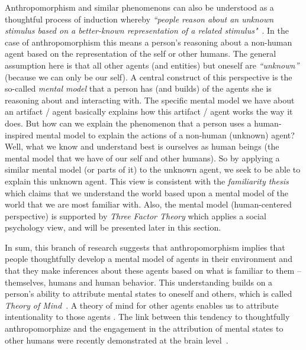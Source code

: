 \documentclass{frontiersSCNS} %
\begin{document}
Anthropomorphism and similar phenomenons can also be understood as a thoughtful process of induction whereby \textit{``people reason about an unknown stimulus based on a better-known representation of a related stimulus"}~\citep{epley_when_2008}. In the case of anthropomorphism this means a person's reasoning about a non-human agent based on the representation of the self or other humans. The general assumption here is that all other agents (and entities) but oneself are \textit{``unknown''} (because we can only be our self). A central construct of this perspective is the so-called \textit{mental model} that a person has (and builds) of the agents she is reasoning about and interacting with. The specific mental model we have about an artifact / agent basically explains how this artifact / agent works the way it does. But how can we explain the phenomenon that a person uses a human-inspired mental model to explain the actions of a non-human (unknown) agent? Well, what we know and understand best is ourselves as human beings (the mental model that we have of our self and other humans). So by applying a similar mental model (or parts of it) to the unknown agent, we seek to be able to explain this unknown agent.
This view is consistent with the \emph{familiarity thesis}~\citep{hegel_understanding_2008} which claims that we understand the world based upon a mental model of the world that we are most familiar with. Also, the mental model (human-centered perspective) is supported by \cite{epley_seeing_2007} \textit{Three Factor Theory} which applies a social psychology view, and will be presented later in this section.

In sum, this branch of research suggests that anthropomorphism implies that people thoughtfully develop a mental model of agents in their environment and that they make inferences about these agents based on what is familiar to them -- themselves, humans and human behavior. This understanding builds on a person's ability to attribute mental states to oneself and others, which is called \textit{Theory of Mind}~\citep{Premack1978}. A theory of mind for other agents enables us to attribute intentionality to those agents \citep{leslie_pretense_1987,admoni_multi-category_2012}. The link between this tendency to thoughtfully anthropomorphize and the engagement in the attribution of mental states to other humans were recently demonstrated at the brain level~\citep{cullen2013individual}.


\end{document}
